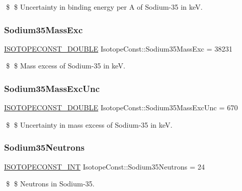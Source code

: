 \$ \$ Uncertainty in binding energy per A of Sodium-\/35 in keV. \mbox{\label{group___isotope_const-_sodium-_na35_ga684c55355729135848a9787799ece78e}} 
\subsubsection{\texorpdfstring{Sodium35\+Mass\+Exc}{Sodium35MassExc}}
{\footnotesize\ttfamily \mbox{\hyperlink{group___isotope_const-_macros_ga8f45a7272ce02c0b4c65c44636ed719a}{I\+S\+O\+T\+O\+P\+E\+C\+O\+N\+S\+T\+\_\+\+D\+O\+U\+B\+LE}} Isotope\+Const\+::\+Sodium35\+Mass\+Exc = 38231}

\$ \$ Mass excess of Sodium-\/35 in keV. \mbox{\label{group___isotope_const-_sodium-_na35_ga8b10d1ddc2b7acbdde3d2629deead3b9}} 
\subsubsection{\texorpdfstring{Sodium35\+Mass\+Exc\+Unc}{Sodium35MassExcUnc}}
{\footnotesize\ttfamily \mbox{\hyperlink{group___isotope_const-_macros_ga8f45a7272ce02c0b4c65c44636ed719a}{I\+S\+O\+T\+O\+P\+E\+C\+O\+N\+S\+T\+\_\+\+D\+O\+U\+B\+LE}} Isotope\+Const\+::\+Sodium35\+Mass\+Exc\+Unc = 670}

\$ \$ Uncertainty in mass excess of Sodium-\/35 in keV. \mbox{\label{group___isotope_const-_sodium-_na35_ga0f090b0709e83355d3128c71f132393d}} 
\subsubsection{\texorpdfstring{Sodium35\+Neutrons}{Sodium35Neutrons}}
{\footnotesize\ttfamily \mbox{\hyperlink{group___isotope_const-_macros_ga5f18360b3e99483a35c32d789e62621c}{I\+S\+O\+T\+O\+P\+E\+C\+O\+N\+S\+T\+\_\+\+I\+NT}} Isotope\+Const\+::\+Sodium35\+Neutrons = 24}

\$ \$ Neutrons in Sodium-\/35. \mbox{\label{group___isotope_const-_sodium-_na35_gae1ae00450cc4ecc87079ee7b9f2f2c24}} 
